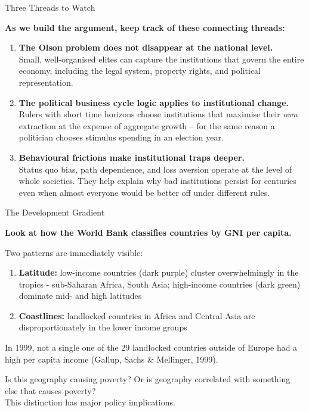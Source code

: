 \documentclass[10pt]{beamer}
\begin{document}
\begin{frame}{Three Threads to Watch}

\textbf{As we build the argument, keep track of these connecting threads:}


\begin{enumerate}
\item \textbf{The Olson problem does not disappear at the national level.} \\[3pt]
\footnotesize Small, well-organised elites can capture the institutions that govern the entire economy, including the legal system, property rights, and political representation.


\item \textbf{The political business cycle logic applies to institutional change.} \\[3pt]
\footnotesize Rulers with short time horizons choose institutions that maximise their \emph{own} extraction at the expense of aggregate growth -- for the same reason a politician chooses stimulus spending in an election year.


\item \textbf{Behavioural frictions make institutional traps deeper.} \\[3pt]
\footnotesize Status quo bias, path dependence, and loss aversion operate at the level of whole societies. They help explain why bad institutions persist for centuries even when almost everyone would be better off under different rules.
\end{enumerate}
\end{frame}

\begin{frame}{The Development Gradient}

\textbf{Look at how the World Bank classifies countries by GNI per capita.}

Two patterns are immediately visible:

\begin{enumerate}
\item \textbf{Latitude:} low-income countries (dark purple) cluster overwhelmingly in the tropics - sub-Saharan Africa, South Asia; high-income countries (dark green) dominate mid- and high latitudes
\item \textbf{Coastlines:} landlocked countries in Africa and Central Asia are disproportionately in the lower income groups
\end{enumerate}


In 1999, not a single one of the 29 landlocked countries outside of Europe had a high per capita income (Gallup, Sachs \& Mellinger, 1999).


\alert{Is this geography causing poverty? Or is geography correlated with something else that causes poverty?}\\[4pt]
This distinction has major policy implications.
\end{frame}
\end{document}

